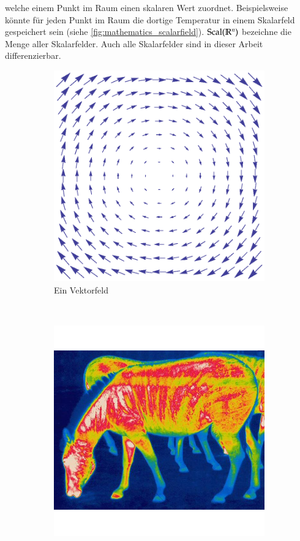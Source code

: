 welche einem Punkt im Raum einen skalaren Wert zuordnet. Beispielsweise könnte
für jeden Punkt im Raum die dortige Temperatur in einem Skalarfeld gespeichert
sein (siehe \autoref{fig:mathematics_scalarfield}).
$\operatorname*{Scal}(\mathbb{R}^n)$ bezeichne die Menge aller
Skalarfelder. Auch alle Skalarfelder sind in dieser Arbeit
differenzierbar.

\begin{figure}
	\begin{subfigure}[t]{0.5\textwidth}
		\centering
		\includegraphics[width=\textwidth]{images/vectorfield}
		\caption{Ein Vektorfeld}
		\label{fig:mathematics_vectorfield}
	\end{subfigure}
	~
	\begin{subfigure}[t]{0.5\textwidth}
		\centering
		\includegraphics[width=\textwidth]{images/thermal_imaging}

\end{subfigure}
\end{figure}
